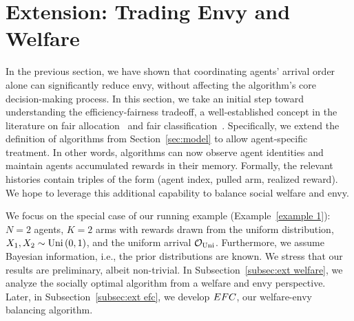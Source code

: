 \section{Extension: Trading Envy and Welfare}
\label{sec:extensions}








In the previous section, we have shown that coordinating agents' arrival order alone can significantly reduce envy, without affecting the algorithm's core decision-making process. In this section, we take an initial step toward understanding the efficiency-fairness tradeoff, a well-established concept in the literature on fair allocation~\cite{varian1973equity,bertsimas2012efficiency}  and fair classification~\cite{menon2018cost,zafar2017fairness}. 
Specifically, we extend the definition of algorithms from Section~\ref{sec:model} to allow agent‐specific treatment. In other words, algorithms can now observe agent identities and maintain agents accumulated rewards in their memory. Formally, the relevant histories contain triples of the form (agent index, pulled arm, realized reward). We hope to leverage this additional capability to balance social welfare and envy. 



We focus on the special case of our running example (Example~\ref{example 1}): $N=2$ agents, $K=2$ arms with rewards drawn from the uniform distribution, $X_1, X_2 \sim \text{Uni}\left(0,1\right)$, and the uniform arrival $\mathcal O_{\textnormal{Uni}}$. Furthermore, we assume Bayesian information, i.e., the prior distributions are known. We stress that our results are preliminary, albeit non-trivial. In Subsection~\ref{subsec:ext welfare}, we analyze the socially optimal algorithm from a welfare and envy perspective. Later, in Subsection~\ref{subsec:ext efc}, we develop $EFC$, our welfare-envy balancing algorithm. 
